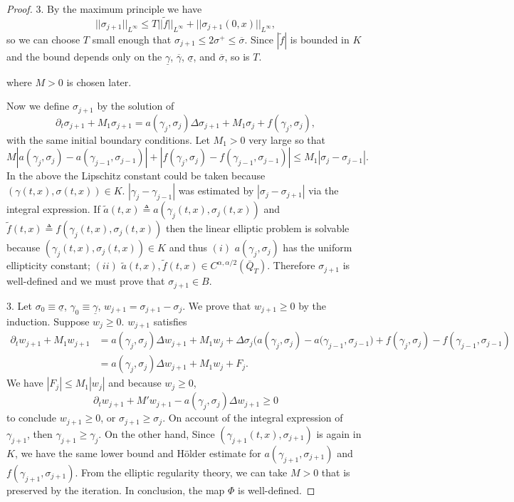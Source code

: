 \documentclass[a4paper,11pt]{article}
\theoremstyle{remark}
\begin{document}
\begin{proof}
3. By the maximum principle we have
$$||\sigma_{j+1}||_{L^\infty} \le T ||\tilde f||_{L^\infty}+ ||\sigma_{j+1}(0,x)||_{L^\infty},$$
so we can choose $T$ small enough that $\sigma_{j+1} \le 2\sigma^+ \le \overline{\sigma}.$ Since $|\tilde f|$ is bounded in $K$ and the bound depends only on the $\underline{\gamma}$, $\overline{\gamma}$, $\underline{\sigma}$, and $\overline{\sigma}$, so is $T$.



where $M>0$ is chosen later.   

Now we define $\sigma_{j+1}$ by the solution of 
\begin{equation}
\partial_t \sigma_{j+1} + M_1\sigma_{j+1} = a(\gamma_j,\sigma_j)\Delta \sigma_{j+1} + M_1\sigma_j + f(\gamma_j,\sigma_j), \label{eq:iteration}
\end{equation}
with the same initial boundary conditions. Let $M_1>0$ very large so that 
$$ M|a(\gamma_j,\sigma_j)-a(\gamma_{j-1},\sigma_{j-1})|+ |f(\gamma_j,\sigma_j)-f(\gamma_{j-1},\sigma_{j-1})| \le M_1|\sigma_j - \sigma_{j-1}|.$$
In the above the Lipschitz constant could be taken because $(\gamma(t,x),\sigma(t,x))\in K$. $|\gamma_j - \gamma_{j-1}|$ was estimated by $|\sigma_j-\sigma_{j+1}|$ via the integral expression. If $\tilde a(t,x)\triangleq a(\gamma_j(t,x),\sigma_j(t,x))$ and $\tilde f(t,x)\triangleq f(\gamma_j(t,x),\sigma_j(t,x))$ then the linear elliptic problem is solvable because $(\gamma_j(t,x),\sigma_j(t,x))\in K$ and thus $(i)$ $a(\gamma_j,\sigma_j)$ has the uniform ellipticity constant; $(ii)$ $\tilde a(t,x),\tilde f(t,x) \in C^{\alpha,\alpha/2}(\bar{Q}_T)$. Therefore $\sigma_{j+1}$ is well-defined and we must prove that $\sigma_{j+1} \in B$.%

3.  Let $\sigma_0 \equiv \underline\sigma$, $\gamma_0\equiv \underline\gamma$, $w_{j+1}=\sigma_{j+1} - \sigma_j$. We prove that $w_{j+1}\ge0$ by the induction. Suppose $w_j\ge0$. $w_{j+1}$ satisfies
\begin{equation}
\begin{aligned}
\partial_t w_{j+1} + M_1w_{j+1} &= a(\gamma_j,\sigma_j)\Delta w_{j+1} + M_1w_j + \Delta \sigma_j\big( a(\gamma_j,\sigma_j)-a(\gamma_{j-1},\sigma_{j-1}\big) + f(\gamma_j,\sigma_j)-f(\gamma_{j-1},\sigma_{j-1})\\
&=a(\gamma_j,\sigma_j)\Delta w_{j+1} + M_1w_j + F_j.
\end{aligned}\label{eq:contraction}
\end{equation}
We have $|F_j| \le M_1|w_j|$ and because $w_j\ge0$, 
$$\partial_t w_{j+1} + M'w_{j+1} - a(\gamma_j,\sigma_j)\Delta w_{j+1} \ge 0$$
to conclude $w_{j+1} \ge 0$, or $\sigma_{j+1} \ge \sigma_{j}$. On account of the integral expression of $\gamma_{j+1}$, then $\gamma_{j+1}\ge \gamma_{j}$. On the other hand,  Since $(\gamma_{j+1}(t,x),\sigma_{j+1})$ is again in $K$, we have the same lower bound and H\"older estimate for $a(\gamma_{j+1},\sigma_{j+1})$ and $f(\gamma_{j+1},\sigma_{j+1})$. From the elliptic regularity theory, we can take $M>0$ that is preserved by the iteration. In conclusion, the map $\Phi$ is well-defined.


\end{proof}
\end{document}
